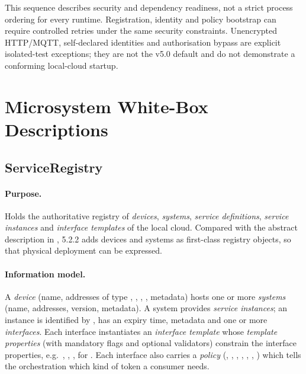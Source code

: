 \documentclass[a4paper]{arrowhead}
\begin{document}
This sequence describes security and dependency readiness, not a strict process
ordering for every runtime. Registration, identity and policy bootstrap can require
controlled retries under the same security constraints. Unencrypted HTTP/MQTT,
self-declared identities and authorisation bypass are explicit isolated-test
exceptions; they are not the v5.0 default and do not demonstrate a conforming
local-cloud startup.

\newpage



\section{Microsystem White-Box Descriptions}
\label{sec:systems}

\subsection{ServiceRegistry}
\label{sec:sr}

\paragraph{Purpose.} Holds the authoritative registry of \emph{devices}, \emph{systems},
\emph{service definitions}, \emph{service instances} and \emph{interface templates} of the
local cloud. Compared with the abstract description in \cite{gsosd50}, 5.2.2 adds devices and
systems as first-class registry objects, so that physical deployment can be expressed.

\paragraph{Information model.}
A \emph{device} (name, addresses of type , , ,
, metadata) hosts one or more \emph{systems} (name, addresses, version,
metadata). A system provides \emph{service instances}; an instance is identified by
, has an expiry time, metadata and one or
more \emph{interfaces}. Each interface instantiates an \emph{interface template} whose
\emph{template properties} (with mandatory flags and optional validators) constrain the
interface properties, e.g.\ , ,
,  for . Each interface also
carries a \emph{policy} (, , ,
, ,
, )
which tells the orchestration which kind of token a consumer needs.
\end{document}
